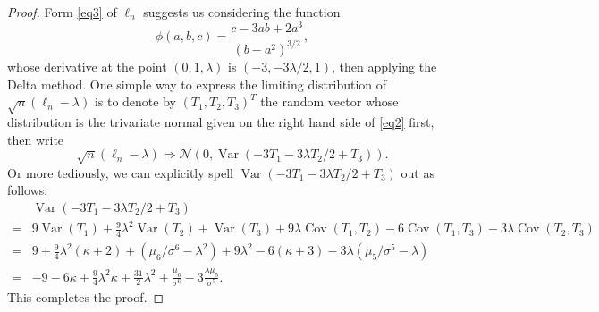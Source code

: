 \documentclass{article}
\DeclareMathOperator*{\Var}{Var}
\DeclareMathOperator*{\Cov}{Cov}
\theoremstyle{definition}
\theoremstyle{plain}
\theoremstyle{remark}
\begin{document}
\begin{description}
\begin{proof}
Form \eqref{eq3} of $\ell_n$ suggests us considering the function
$$\phi(a, b, c) = \frac{c - 3ab + 2a^3}{(b - a^2)^{3/2}},$$
whose derivative at the point $(0, 1, \lambda)$ is $(-3, -3\lambda/2, 1)$, then applying the Delta method. 
One simple way to express the limiting distribution of $\sqrt{n}(\ell_n - \lambda)$ is to denote by $(T_1, T_2, T_3)^T$ the random 
vector whose distribution is the trivariate normal given on the right hand side of \eqref{eq2} first, then write
\begin{equation*}
\sqrt{n}(\ell_n - \lambda) \Rightarrow \mathcal{N}(0, \Var(-3T_1 - 3\lambda T_2/2 + T_3)).
\end{equation*}
Or more tediously, we can explicitly spell $\Var(-3T_1 - 3\lambda T_2/2 + T_3)$ out as follows:
\begin{align*}
& \Var(-3T_1 - 3\lambda T_2/2 + T_3) \\
= & 9\Var(T_1) + \frac{9}{4}\lambda^2\Var(T_2) + \Var(T_3) + 9\lambda\Cov(T_1, T_2) - 6\Cov(T_1, T_3) - 3\lambda\Cov(T_2, T_3) \\
= &  9+ \frac{9}{4}\lambda^2(\kappa + 2) + (\mu_6/\sigma^6 - \lambda^2) + 9\lambda^2 - 6(\kappa + 3) - 3\lambda(
\mu_5/\sigma^5 - \lambda) \\
= & \boxed{-9 - 6\kappa+ \frac{9}{4}\lambda^2\kappa + \frac{31}{2}\lambda^2 + \frac{\mu_6}{\sigma^6} - 3\frac{\lambda\mu_5}{\sigma^5}}.
\end{align*}
This completes the proof.
\end{proof}


\end{description}
\end{document}

